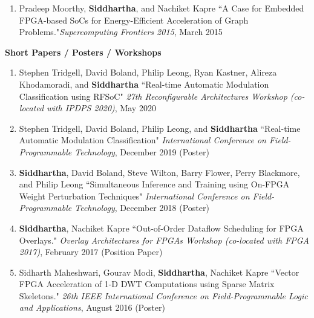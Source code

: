 \documentclass[10pt]{article}
\begin{document}
\begin{enumerate}
    \item Pradeep Moorthy, {\bf Siddhartha}, and Nachiket Kapre ``A Case for Embedded FPGA-based SoCs for Energy-Efficient Acceleration of Graph Problems."\newline\emph{Supercomputing Frontiers 2015}, March 2015
\end{enumerate}
\textbf{\large Short Papers / Posters / Workshops}
\begin{enumerate}
    \item Stephen Tridgell, David Boland, Philip Leong, Ryan Kastner, Alireza Khodamoradi, and {\bf Siddhartha} ``Real-time Automatic Modulation Classification using RFSoC" \emph{27th Reconfigurable Architectures Workshop (co-located with IPDPS 2020)}, May 2020
    \item Stephen Tridgell, David Boland, Philip Leong, and {\bf Siddhartha} ``Real-time Automatic Modulation Classification" \emph{International Conference on Field-Programmable Technology}, December 2019 (Poster)
    \item {\bf Siddhartha}, David Boland, Steve Wilton, Barry Flower, Perry Blackmore, and Philip Leong ``Simultaneous Inference and Training using On-FPGA Weight Perturbation Techniques" \emph{International Conference on Field-Programmable Technology}, December 2018 (Poster)
    \item {\bf Siddhartha}, Nachiket Kapre ``Out-of-Order Dataflow Scheduling for FPGA Overlays." \emph{Overlay Architectures for FPGAs Workshop (co-located with FPGA 2017)}, February 2017 (Position Paper)
    \item Sidharth Maheshwari, Gourav Modi, {\bf Siddhartha}, Nachiket Kapre ``Vector FPGA Acceleration of 1-D DWT Computations using Sparse Matrix Skeletons." \emph{26th IEEE International Conference on Field-Programmable Logic and Applications}, August 2016 (Poster)

\end{enumerate}
\end{document}
